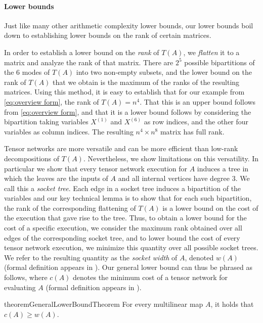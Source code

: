 \paragraph*{Lower bounds}

Just like many other arithmetic complexity lower bounds, our lower bounds
boil down to establishing lower bounds on the rank of certain
matrices.

In order to establish a lower bound on the \emph{rank} of $T(A)$,
we \emph{flatten} it to a matrix and analyze the rank of that
matrix.  There are $2^5$ possible bipartitions of the $6$ modes of
$T(A)$ into two non-empty subsets, and the lower bound on the rank of
$T(A)$ that we obtain is the maximum of the ranks of the
resulting matrices.  Using this method, it is easy to establish that
for our example from \eqref{eq:overview form}, the rank of
$T(A) = n^4$.  That this is an upper bound follows from
\eqref{eq:overview form}, and that it is a lower bound follows by
considering the bipartition taking variables $X^{(1)}$ and
$X^{(6)}$ as row indices, and the other four variables as column indices.
The resulting $n^4 \times n^8$ matrix has full rank.

Tensor networks are more versatile and can be more efficient
than low-rank decompositions of $T(A)$.  Nevertheless, we show
limitations on this versatility.  In particular we show that every
tensor network execution for $A$ induces a tree in which the leaves are the inputs of $A$ and all internal vertices have degree $3$.  We call this a \emph{socket tree}.  Each edge in a socket
tree induces a bipartition of the variables and our key technical
lemma is to show that for each such bipartition, the rank of the
corresponding flattening of $T(A)$ is a lower bound on the
cost of the execution that gave rise to the tree.  Thus, to obtain a lower
bound for the cost of a specific execution, we consider the maximum
rank obtained over all
edges of the corresponding socket tree, and to lower bound the cost of
every tensor network execution, we minimize this quantity over all
possible socket trees.  We refer to the resulting quantity as the
\emph{socket width} of $A$, denoted $w(A)$ (formal definition appears in ).  Our general lower bound
can thus be phrased as follows, where $c(A)$ denotes the minimum cost of a tensor network for evaluating $A$ (formal definition appears in ).

\begin{restatable}{theorem}{GeneralLowerBoundTheorem}
  \label{thm:general lower bound}
  For every multilinear map $A$, it holds that $c(A) \ge w(A)$.
\end{restatable}

